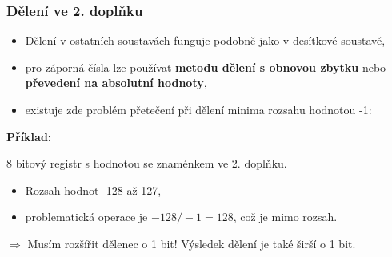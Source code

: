  \begin{frame}
    \frametitle{Dělení ve 2. doplňku}
    \boldmath
    
    \begin{itemize}
      \item Dělení v ostatních soustavách funguje podobně jako v desítkové soustavě,
      \item pro záporná čísla lze používat \textbf{metodu dělení s obnovou zbytku} nebo \textbf{převedení na absolutní hodnoty},
      \item existuje zde problém přetečení při dělení minima rozsahu hodnotou -1:
    \end{itemize}
    \vspace{5mm}
    
      \textbf{Příklad:} 
      
       8 bitový registr s hodnotou se znaménkem ve 2. doplňku.
        
        \begin{itemize}
          \item Rozsah hodnot -128 až 127,
          \item problematická operace je $-128/-1 = 128$, což je mimo rozsah.
        \end{itemize}
      
      $\Longrightarrow$ Musím rozšířit dělenec o 1 bit! Výsledek dělení je také širší o 1 bit.
	\end{frame}
 
